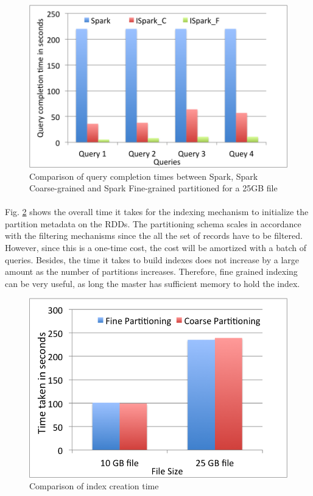 \begin{figure}[!ht]
\caption{Comparison of query completion times between Spark, Spark Coarse-grained and Spark Fine-grained partitioned for a 25GB file}
\label{fig:exp8}
\includegraphics[scale=0.50]{./images/exp8.png}
\end{figure}

\paragraph{}
Fig. \ref{fig:exp9} shows the overall time it takes for the indexing
mechanism to initialize the partition metadata on the RDDs. The
partitioning schema scales in accordance with the filtering mechanisms
since the all the set of records have to be filtered. However, since
this is a one-time cost, the cost will be amortized with a batch of
queries. Besides, the time it takes to build indexes does not increase
by a large amount as the number of partitions increases. Therefore, fine
grained indexing can be very useful, as long the master has sufficient
memory to hold the index.

\begin{figure}[!ht]
\caption{Comparison of index creation time}
\label{fig:exp9}
\includegraphics[scale=0.50]{./images/exp9.png}
\end{figure}
